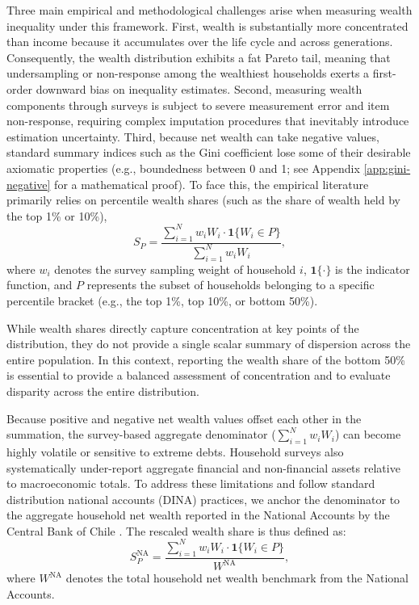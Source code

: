 Three main empirical and methodological challenges arise when measuring wealth inequality under this framework. First, wealth is substantially more concentrated than income because it accumulates over the life cycle and across generations. Consequently, the wealth distribution exhibits a fat Pareto tail, meaning that undersampling or non-response among the wealthiest households exerts a first-order downward bias on inequality estimates. Second, measuring wealth components through surveys is subject to severe measurement error and item non-response, requiring complex imputation procedures that inevitably introduce estimation uncertainty. Third, because net wealth can take negative values, standard summary indices such as the Gini coefficient \citep{gini1912variabilita} lose some of their desirable axiomatic properties (e.g., boundedness between 0 and 1; see Appendix \ref{app:gini-negative} for a mathematical proof). To face this, the empirical literature primarily relies on percentile wealth shares (such as the share of wealth held by the top 1\% or 10\%), 
\begin{equation}
    S_P = \frac{\sum_{i=1}^N w_i W_i \cdot \mathbf{1}\{W_i \in P\}}{\sum_{i=1}^N w_i W_i},
    \label{eq:wealth_share}
\end{equation}
where $w_i$ denotes the survey sampling weight of household $i$, $\mathbf{1}\{\cdot\}$ is the indicator function, and $P$ represents the subset of households belonging to a specific percentile bracket (e.g., the top 1\%, top 10\%, or bottom 50\%).

While wealth shares directly capture concentration at key points of the distribution, they do not provide a single scalar summary of dispersion across the entire population. In this context, reporting the wealth share of the bottom 50\% is essential to provide a balanced assessment of concentration and to evaluate disparity across the entire distribution. 

Because positive and negative net wealth values offset each other in the summation, the survey-based aggregate denominator ($\sum_{i=1}^N w_i W_i$) can become highly volatile or sensitive to extreme debts. Household surveys also systematically under-report aggregate financial and non-financial assets relative to macroeconomic totals. To address these limitations and follow standard distribution national accounts (DINA) practices, we anchor the denominator to the aggregate household net wealth reported in the National Accounts by the Central Bank of Chile \citep{bcentral2021financialaccounts}. The rescaled wealth share is thus defined as:
\begin{equation}
    S_P^{\text{NA}} = \frac{\sum_{i=1}^N w_i W_i \cdot \mathbf{1}\{W_i \in P\}}{W^{\text{NA}}},
    \label{eq:wealth_share_na}
\end{equation}
where $W^{\text{NA}}$ denotes the total household net wealth benchmark from the National Accounts. 

